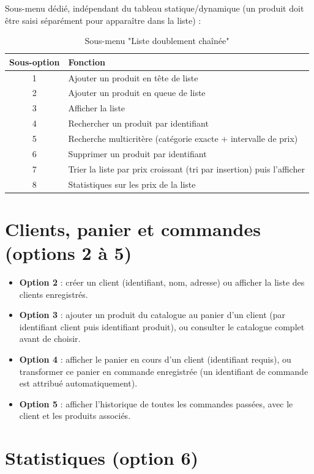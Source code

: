 \documentclass[11pt,a4paper]{article}
\begin{document}
Sous-menu dédié, indépendant du tableau statique/dynamique (un produit doit
être saisi séparément pour apparaître dans la liste) :

\begin{table}[h]
\centering
\begin{tabular}{cl}
\toprule
Sous-option & Fonction \\
\midrule
1 & Ajouter un produit en tête de liste \\
2 & Ajouter un produit en queue de liste \\
3 & Afficher la liste \\
4 & Rechercher un produit par identifiant \\
5 & Recherche multicritère (catégorie exacte + intervalle de prix) \\
6 & Supprimer un produit par identifiant \\
7 & Trier la liste par prix croissant (tri par insertion) puis l'afficher \\
8 & Statistiques sur les prix de la liste \\
\bottomrule
\end{tabular}
\caption{Sous-menu "Liste doublement chaînée"}
\end{table}

\section{Clients, panier et commandes (options 2 à 5)}

\begin{itemize}
  \item \textbf{Option 2} : créer un client (identifiant, nom, adresse) ou
        afficher la liste des clients enregistrés.
  \item \textbf{Option 3} : ajouter un produit du catalogue au panier d'un
        client (par identifiant client puis identifiant produit), ou
        consulter le catalogue complet avant de choisir.
  \item \textbf{Option 4} : afficher le panier en cours d'un client
        (identifiant requis), ou transformer ce panier en commande
        enregistrée (un identifiant de commande est attribué automatiquement).
  \item \textbf{Option 5} : afficher l'historique de toutes les commandes
        passées, avec le client et les produits associés.
\end{itemize}

\section{Statistiques (option 6)}
\end{document}
